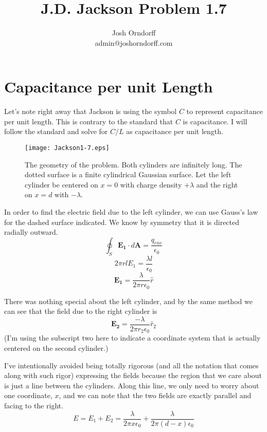 \documentclass[10pt,a4paper]{article}
\begin{document}
\title{J.D. Jackson Problem 1.7}
\author{Josh Orndorff \\ admin@joshorndorff.com}
\maketitle

\section{Capacitance per unit Length}
Let's note right away that Jackson is using the symbol $C$ to represent capacitance per unit length. This is contrary to the standard that $C$ is capacitance. I will follow the standard and solve for $C/L$ as capacitance per unit length.
\begin{figure}[h]
\centering
\texttt{[image: Jackson1-7.eps]}
\caption{The geometry of the problem. Both cylinders are infinitely long. The dotted surface is a finite cylindrical Gaussian surface. Let the left cylinder be centered on $x=0$ with charge density $+\lambda$ and the right on $x=d$ with $-\lambda$.}
\end{figure}

In order to find the electric field due to the left cylinder, we can use Gauss's law for the dashed surface indicated. We know by symmetry that it is directed radially outward.
\begin{equation}
\oint_S \mathbf{E_1}\cdot d\mathbf{A} = \frac{q_{enc}}{\epsilon_0}
\end{equation}
\begin{equation}
2\pi r l E_1= \frac{\lambda l}{\epsilon_0}
\end{equation}
\begin{equation}
\mathbf{E_1}= \frac{\lambda}{2\pi r \epsilon_0}\hat{r}
\end{equation}

There was nothing special about the left cylinder, and by the same method we can see that the field due to the right cylinder is
\begin{equation}
\mathbf{E_2}= \frac{-\lambda}{2\pi r_2 \epsilon_0}\hat{r}_2
\end{equation}
(I'm using the subscript two here to indicate a coordinate system that is actually centered on the second cylinder.)

I've intentionally avoided being totally rigorous (and all the notation that comes along with such rigor) expressing the fields because the region that we care about is just a line between the cylinders.  Along this line, we only need to worry about one coordinate, $x$, and we can note that the two fields are exactly parallel and facing to the right.
\begin{equation}
E=E_1+E_2=\frac{\lambda}{2\pi x \epsilon_0}+\frac{\lambda}{2\pi (d-x) \epsilon_0}
\end{equation}
\end{document}
